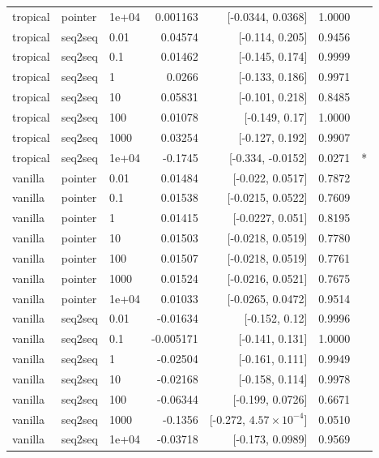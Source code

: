 \documentclass[10pt]{article}
\begin{document}
{\begin{longtable}{lllrrrl}
tropical & pointer & 1e+04 & 0.001163 & [-0.0344, 0.0368] & 1.0000 & \\
tropical & seq2seq & 0.01 & 0.04574 & [-0.114, 0.205] & 0.9456 & \\
tropical & seq2seq & 0.1 & 0.01462 & [-0.145, 0.174] & 0.9999 & \\
tropical & seq2seq & 1 & 0.0266 & [-0.133, 0.186] & 0.9971 & \\
tropical & seq2seq & 10 & 0.05831 & [-0.101, 0.218] & 0.8485 & \\
tropical & seq2seq & 100 & 0.01078 & [-0.149, 0.17] & 1.0000 & \\
tropical & seq2seq & 1000 & 0.03254 & [-0.127, 0.192] & 0.9907 & \\
tropical & seq2seq & 1e+04 & -0.1745 & [-0.334, -0.0152] & 0.0271 & *\\
vanilla & pointer & 0.01 & 0.01484 & [-0.022, 0.0517] & 0.7872 & \\
vanilla & pointer & 0.1 & 0.01538 & [-0.0215, 0.0522] & 0.7609 & \\
vanilla & pointer & 1 & 0.01415 & [-0.0227, 0.051] & 0.8195 & \\
vanilla & pointer & 10 & 0.01503 & [-0.0218, 0.0519] & 0.7780 & \\
vanilla & pointer & 100 & 0.01507 & [-0.0218, 0.0519] & 0.7761 & \\
vanilla & pointer & 1000 & 0.01524 & [-0.0216, 0.0521] & 0.7675 & \\
vanilla & pointer & 1e+04 & 0.01033 & [-0.0265, 0.0472] & 0.9514 & \\
vanilla & seq2seq & 0.01 & -0.01634 & [-0.152, 0.12] & 0.9996 & \\
vanilla & seq2seq & 0.1 & -0.005171 & [-0.141, 0.131] & 1.0000 & \\
vanilla & seq2seq & 1 & -0.02504 & [-0.161, 0.111] & 0.9949 & \\
vanilla & seq2seq & 10 & -0.02168 & [-0.158, 0.114] & 0.9978 & \\
vanilla & seq2seq & 100 & -0.06344 & [-0.199, 0.0726] & 0.6671 & \\
vanilla & seq2seq & 1000 & -0.1356 & [-0.272, $4.57\times10^{-4}$] & 0.0510 & \\
vanilla & seq2seq & 1e+04 & -0.03718 & [-0.173, 0.0989] & 0.9569 & \\
\bottomrule
\end{longtable}
}
\end{document}

